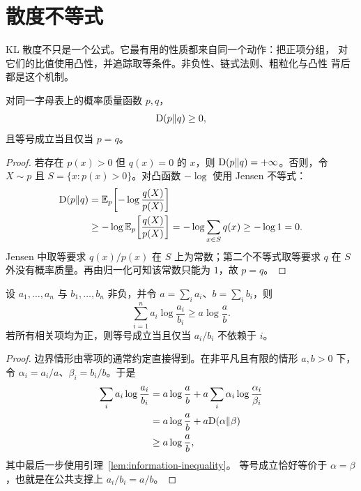 \section{散度不等式}\label{sec:divergence-properties}
\quad{}

\begin{strand}
KL 散度不只是一个公式。它最有用的性质都来自同一个动作：把正项分组，
对它们的比值使用凸性，并追踪取等条件。非负性、链式法则、粗粒化与凸性
背后都是这个机制。
\end{strand}

\begin{lemma}[信息不等式]\label{lem:information-inequality}
对同一字母表上的概率质量函数 $p,q$，
\[
  \mathrm{D}(p\Vert q)\ge0,
\]
且等号成立当且仅当 $p=q$。
\end{lemma}

\begin{proof}
若存在 $p(x)>0$ 但 $q(x)=0$ 的 $x$，则
$\mathrm{D}(p\Vert q)=+\infty$。否则，令 $X\sim p$ 且
$S=\{x:p(x)>0\}$。对凸函数 $-\log$ 使用 Jensen 不等式：
\begin{align*}
  \mathrm{D}(p\Vert q)
  &=\mathbb{E}_p\!\left[-\log\frac{q(X)}{p(X)}\right]\\
  &\ge-\log\mathbb{E}_p\!\left[\frac{q(X)}{p(X)}\right]
   =-\log\sum_{x\in S}q(x)
  \ge-\log1=0.
\end{align*}
Jensen 中取等要求 $q(x)/p(x)$ 在 $S$ 上为常数；第二个不等式取等要求
$q$ 在 $S$ 外没有概率质量。再由归一化可知该常数只能为 $1$，故 $p=q$。
\end{proof}

\begin{theorem}\label{thm:log-sum}
设 $a_1,\ldots,a_n$ 与 $b_1,\ldots,b_n$ 非负，并令
$a=\sum_i a_i$、$b=\sum_i b_i$，则
\[
  \sum_{i=1}^n a_i\log\frac{a_i}{b_i}
  \ge a\log\frac{a}{b}.
\]
若所有相关项均为正，则等号成立当且仅当 $a_i/b_i$ 不依赖于 $i$。
\end{theorem}

\begin{proof}
边界情形由零项的通常约定直接得到。在非平凡且有限的情形 $a,b>0$ 下，
令 $\alpha_i=a_i/a$、$\beta_i=b_i/b$。于是
\begin{align*}
  \sum_i a_i\log\frac{a_i}{b_i}
  &=a\log\frac{a}{b}
    +a\sum_i\alpha_i\log\frac{\alpha_i}{\beta_i}\\
  &=a\log\frac{a}{b}+a\mathrm{D}(\alpha\Vert\beta)\\
  &\ge a\log\frac{a}{b},
\end{align*}
其中最后一步使用引理~\ref{lem:information-inequality}。
等号成立恰好等价于 $\alpha=\beta$，也就是在公共支撑上
$a_i/b_i=a/b$。
\end{proof}

